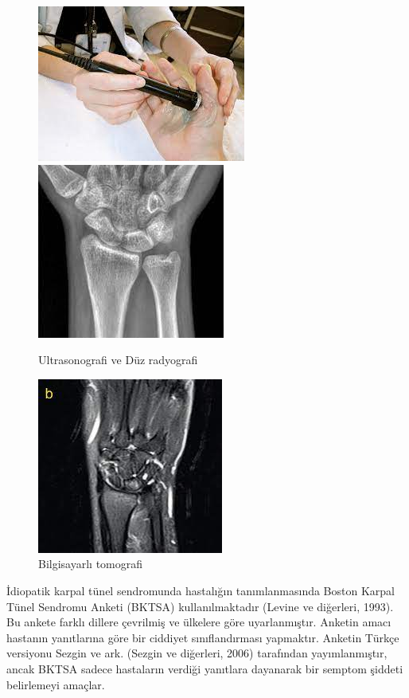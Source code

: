 \documentclass[12pt,twoside]{deuthesis}
\begin{document}
\begin{figure}

{\centering \includegraphics[width=0.49\linewidth,height=0.22\textheight]{figure/ultraradyo} \includegraphics[width=0.49\linewidth,height=0.22\textheight]{figure/radyog} 

}

\caption{Ultrasonografi ve Düz radyografi }\label{fig:unnamed-chunk-5}
\end{figure}
\begin{figure}

{\centering \includegraphics[width=0.49\linewidth,height=0.22\textheight]{figure/bt} 

}

\caption{Bilgisayarlı tomografi }\label{fig:unnamed-chunk-6}
\end{figure}
İdiopatik karpal tünel sendromunda hastalığın tanımlanmasında Boston Karpal Tünel Sendromu
Anketi (BKTSA) kullanılmaktadır (Levine ve diğerleri, 1993). Bu ankete farklı dillere çevrilmiş ve ülkelere göre uyarlanmıştır. Anketin amacı hastanın yanıtlarına göre bir ciddiyet sınıflandırması yapmaktır. Anketin Türkçe versiyonu Sezgin ve ark. (Sezgin ve diğerleri, 2006) tarafından yayımlanmıştır, ancak BKTSA sadece hastaların verdiği yanıtlara dayanarak bir semptom şiddeti belirlemeyi amaçlar.
\end{document}
